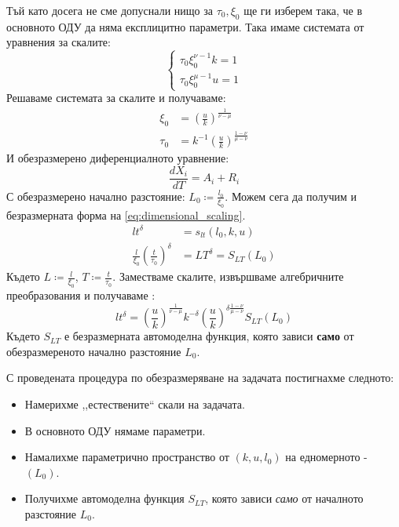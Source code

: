Тъй като досега не сме допуснали нищо за $\tau_0, \xi_0$ ще ги изберем така, че в основното ОДУ да няма експлицитно параметри. Така имаме системата от уравнения за скалите:
\begin{equation}
    \begin{cases}
        \tau_0 \xi_0^{\nu-1} k = 1 \\
         \tau_0 \xi_0^{\mu-1} u = 1
    \end{cases} 
\end{equation}
Решаваме системата за скалите и получаваме:
\begin{align*}
    \xi_0 &= \left( \frac{u}{k} \right)^ {\frac{1}{\nu - \mu}} \\
    \tau_0 &= k^{-1} \left( \frac{u}{k} \right) ^ {\frac{1-\nu}{\mu - \nu}}
\end{align*}
И обезразмерено диференциалното уравнение:
\begin{equation}
    \label{eq:non_dimenisonal_ode}
    \frac{d X_i}{d T} = A_i + R_i
\end{equation}
С обезразмерено начално разстояние: $L_0 \coloneqq \frac{l_0}{\xi_0}$.
Можем сега да получим и безразмерната форма на \autoref{eq:dimensional_scaling}.
\begin{align*}
    l t^\delta &= s_{l t}(l_0, k, u) \\
    \frac{l}{\xi_0} \left(\frac{t}{\tau_0}\right)^{\delta} &= L T ^\delta = S_{L T} (L_0)
\end{align*}
Където $L \coloneqq \frac{l}{\xi_0}$, $T \coloneqq \frac{t}{\tau_0}$. Заместваме скалите, извършваме алгебричните преобразования и получаваме \cite{Krasteva2016}:
\begin{equation*}
    l t ^ \delta =  \left( \frac{u}{k} \right)^ {\frac{1}{\nu - \mu}} k^{-\delta} \left( \frac{u}{k} \right) ^ {\delta \frac{1-\nu}{\mu - \nu}} S_{L T} (L_0)
\end{equation*}
Където $S_{L T}$ е безразмерната автомоделна функция, която зависи \textbf{само} от обезразмереното начално разстояние $L_0$.

С проведената процедура по обезразмеряване на задачата постигнахме следното:
\begin{itemize}
    \item Намерихме ,,естествените`` скали на задачата.
    \item В основното ОДУ нямаме параметри.
    \item Намалихме параметрично пространство от $(k, u, l_0)$ на едномерното - $(L_0)$.
    \item Получихме автомоделна функция $S_{L T}$, която зависи \textit{само} от началното разстояние $L_0$.
\end{itemize}

